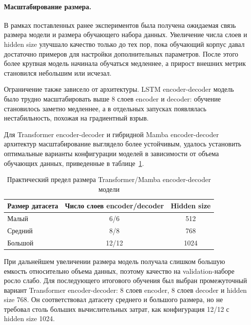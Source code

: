 \paragraph{Масштабирование размера.}
В рамках поставленных ранее экспериментов была получена ожидаемая связь размера модели и размера обучающего набора данных. Увеличение числа слоев и hidden size улучшало качество только до тех пор, пока обучающий корпус давал достаточно примеров для настройки дополнительных параметров. После этого более крупная модель начинала обучаться медленнее, а прирост внешних метрик становился небольшим или исчезал.

Ограничение также зависело от архитектуры. LSTM encoder-decoder модель было трудно масштабировать выше 8 слоев encoder и decoder: обучение становилось заметно медленнее, а в отдельных запусках появлялась нестабильность, похожая на градиентный взрыв.

Для Transformer encoder-decoder и гибридной Mamba encoder-decoder архитектур масштабирование выглядело более устойчивым, удалось установить оптимальные варианты конфигурации моделей в зависимости от объема обучающих данных, приведенные в таблице~\ref{tab:model-size-data-scale}.

\begin{table}[H]
	\centering
	\caption{Практический предел размера Transformer/Mamba encoder-decoder модели}
	\label{tab:model-size-data-scale}
	\begin{tabular}{|p{}|c|c|}
		\hline
		\textbf{Размер датасета} & \textbf{Число слоев encoder/decoder} & \textbf{Hidden size} \\
		\hline
		Малый                    & 6/6                                  & 512                  \\
		\hline
		Средний                  & 8/8                                  & 768                  \\
		\hline
		Большой                  & 12/12                                & 1024                 \\
		\hline
	\end{tabular}
\end{table}

При дальнейшем увеличении размера модель получала слишком большую емкость относительно объема данных, поэтому качество на validation-наборе росло слабо. Для последующего итогового обучения был выбран промежуточный вариант Transformer encoder-decoder: 8 слоев encoder, 8 слоев decoder и hidden size 768. Он соответствовал датасету среднего и большого размера, но не требовал столь больших вычислительных затрат, как конфигурация 12/12 с hidden size 1024.

